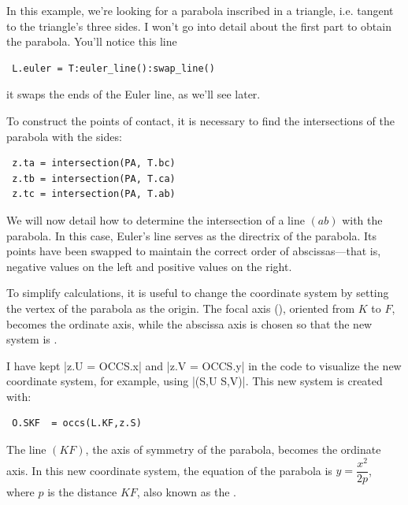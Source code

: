 In this example, we're looking for a parabola inscribed in a triangle, i.e. tangent to the triangle's three sides.
I won't go into detail about the first part to obtain the parabola. You'll notice this line

\begin{mybox}
\begin{verbatim}
 L.euler = T:euler_line():swap_line()
\end{verbatim}
\end{mybox}

it swaps the ends of the Euler line, as we'll see later.

 To construct the points of contact, it is necessary to find the intersections of the parabola with the sides:

\begin{mybox}
\begin{verbatim}
 z.ta = intersection(PA, T.bc)
 z.tb = intersection(PA, T.ca)
 z.tc = intersection(PA, T.ab)
\end{verbatim}
\end{mybox}

We will now detail how to determine the intersection of a line $(ab)$ with the parabola. In this case, Euler's line serves as the directrix of the parabola. Its points have been swapped to maintain the correct order of abscissas—that is, negative values on the left and positive values on the right.

To simplify calculations, it is useful to change the coordinate system by setting the vertex of the parabola as the origin. The focal axis (), oriented from $K$ to $F$, becomes the ordinate axis, while the abscissa axis is chosen so that the new system is .

I have kept |z.U = OCCS.x| and |z.V = OCCS.y| in the code to visualize the new coordinate system, for example, using |\tkzDrawSegments[red,->](S,U S,V)|. This new system is created with:

\begin{mybox}
\begin{verbatim}
 O.SKF  = occs(L.KF,z.S)
\end{verbatim}
\end{mybox}

The line $(KF)$, the axis of symmetry of the parabola, becomes the ordinate axis. In this new coordinate system, the equation of the parabola is $y = \dfrac{x^2}{2p}$, where $p$ is the distance $KF$, also known as the .

